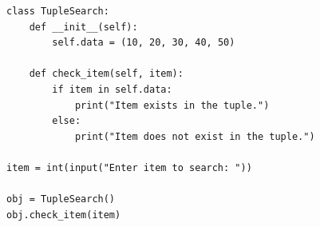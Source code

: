 \begin{verbatim}
class TupleSearch:
    def __init__(self):
        self.data = (10, 20, 30, 40, 50)

    def check_item(self, item):
        if item in self.data:
            print("Item exists in the tuple.")
        else:
            print("Item does not exist in the tuple.")

item = int(input("Enter item to search: "))

obj = TupleSearch()
obj.check_item(item)
\end{verbatim}